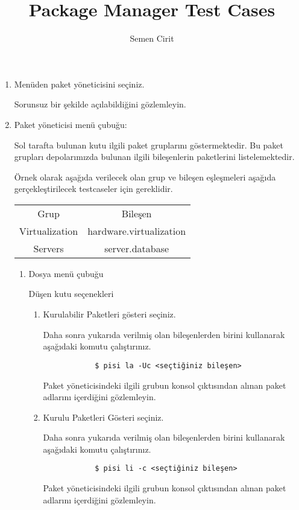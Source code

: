 \documentclass[a4paper,10pt]{article}
\title{Package Manager Test Cases}
\author{Semen Cirit}
\begin{document}
\maketitle

\begin{enumerate}
    \item Menüden paket yöneticisini seçiniz.
	
	  Sorunsuz bir şekilde açılabildiğini gözlemleyin.
 

    \item Paket yöneticisi menü çubuğu:

    Sol tarafta bulunan kutu ilgili paket gruplarını göstermektedir. Bu paket grupları depolarımızda bulunan ilgili bileşenlerin paketlerini listelemektedir.

    Örnek olarak aşağıda verilecek olan grup ve bileşen eşleşmeleri aşağıda gerçekleştirilecek testcaseler için gereklidir.
     \begin{table}[h]
	  \centering
	  \begin{tabular}{|c|c|}
		  \hline
		  Grup & Bileşen \\
		  Virtualization & hardware.virtualization \\
		  Servers & server.database \\
		  \hline
	  \end{tabular} 
	  \label{tab:tbl}
    \end{table}
    
    \begin{enumerate}
        \item Dosya menü çubuğu
    
        Düşen kutu seçenekleri
        \begin{enumerate}
            \item Kurulabilir Paketleri gösteri seçiniz.
            
	     Daha sonra yukarıda verilmiş olan bileşenlerden birini kullanarak aşağıdaki komutu çalıştırınız.
            \begin{verbatim}
            $ pisi la -Uc <seçtiğiniz bileşen>
            \end{verbatim}
            Paket yöneticisindeki ilgili grubun konsol çıktısından alınan paket adlarını içerdiğini gözlemleyin.
            \item Kurulu Paketleri Gösteri seçiniz.

             Daha sonra yukarıda verilmiş olan bileşenlerden birini kullanarak aşağıdaki komutu çalıştırınız.
            \begin{verbatim}
            $ pisi li -c <seçtiğiniz bileşen>
            \end{verbatim}
            Paket yöneticisindeki ilgili grubun konsol çıktısından alınan paket adlarını içerdiğini gözlemleyin.
    

\end{enumerate}
\end{enumerate}
\end{enumerate}
\end{document}
